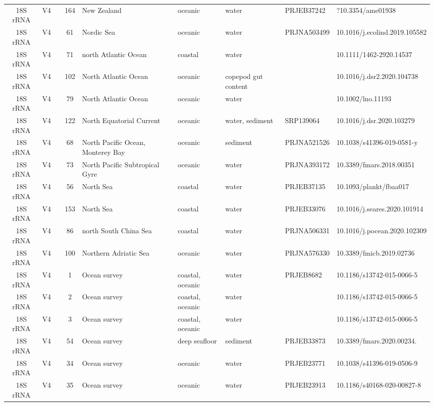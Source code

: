 \begin{longtable}{cccclllll}
  18S rRNA & V4 &  & 164 & New Zealand & oceanic & water & PRJEB37242 & ?10.3354/ame01938 \\ 
  18S rRNA & V4 &  & 61 & Nordic Sea & oceanic & water & PRJNA503499 & 10.1016/j.ecolind.2019.105582 \\ 
  18S rRNA & V4 &  & 71 & north Atlantic Ocean & coastal & water &  & 10.1111/1462-2920.14537 \\ 
  18S rRNA & V4 &  & 102 & North Atlantic Ocean & oceanic & copepod gut content &  & 10.1016/j.dsr2.2020.104738 \\ 
  18S rRNA & V4 &  & 79 & North Atlantic Ocean & oceanic & water &  & 10.1002/lno.11193 \\ 
  18S rRNA & V4 &  & 122 & North Equatorial Current & oceanic & water, sediment & SRP139064 & 10.1016/j.dsr.2020.103279 \\ 
  18S rRNA & V4 &  & 68 & North Pacific Ocean, Monterey Bay & oceanic & sediment & PRJNA521526 & 10.1038/s41396-019-0581-y \\ 
  18S rRNA & V4 &  & 73 & North Pacific Subtropical Gyre & oceanic & water & PRJNA393172 & 10.3389/fmars.2018.00351 \\ 
  18S rRNA & V4 &  & 56 & North Sea & coastal & water & PRJEB37135 & 10.1093/plankt/fbaa017 \\ 
  18S rRNA & V4 &  & 153 & North Sea & coastal & water & PRJEB33076 & 10.1016/j.seares.2020.101914 \\ 
  18S rRNA & V4 &  & 86 & north South China Sea & coastal & water & PRJNA506331 & 10.1016/j.pocean.2020.102309 \\ 
  18S rRNA & V4 &  & 100 & Northern Adriatic Sea & oceanic & water & PRJNA576330 & 10.3389/fmicb.2019.02736 \\ 
  18S rRNA & V4 &  & 1 & Ocean survey & coastal, oceanic & water & PRJEB8682 & 10.1186/s13742-015-0066-5 \\ 
  18S rRNA & V4 &  & 2 & Ocean survey & coastal, oceanic & water &  & 10.1186/s13742-015-0066-5 \\ 
  18S rRNA & V4 &  & 3 & Ocean survey & coastal, oceanic & water &  & 10.1186/s13742-015-0066-5 \\ 
  18S rRNA & V4 &  & 54 & Ocean survey & deep seafloor & sediment & PRJEB33873 & 10.3389/fmars.2020.00234. \\ 
  18S rRNA & V4 &  & 34 & Ocean survey & oceanic & water & PRJEB23771 & 10.1038/s41396-019-0506-9 \\ 
  18S rRNA & V4 &  & 35 & Ocean survey & oceanic & water & PRJEB23913 & 10.1186/s40168-020-00827-8 \\ 

\end{longtable}
